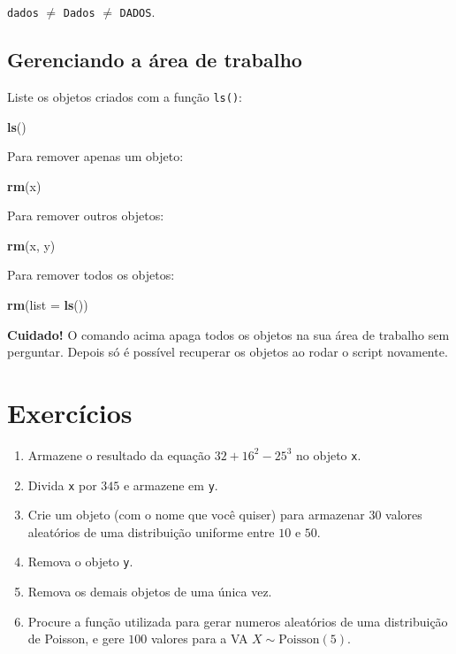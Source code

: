 \documentclass[10pt,a4paper]{book}
\newenvironment{Shaded}{\begin{snugshade}}{\end{snugshade}}
\newcommand{\KeywordTok}[1]{\textcolor[rgb]{0.13,0.29,0.53}{\textbf{#1}}}
\newcommand{\DataTypeTok}[1]{\textcolor[rgb]{0.13,0.29,0.53}{#1}}
\newcommand{\NormalTok}[1]{#1}
\providecommand{\tightlist}{%
  \setlength{\itemsep}{0pt}\setlength{\parskip}{0pt}}
\begin{document}
\texttt{dados} \(\neq\) \texttt{Dados} \(\neq\) \texttt{DADOS}.

\subsection{Gerenciando a área de
trabalho}\label{gerenciando-a-uxe1rea-de-trabalho}

Liste os objetos criados com a função \texttt{ls()}:

\begin{Shaded}
\begin{Highlighting}[]
\KeywordTok{ls}\NormalTok{()}
\end{Highlighting}
\end{Shaded}

Para remover apenas um objeto:

\begin{Shaded}
\begin{Highlighting}[]
\KeywordTok{rm}\NormalTok{(x)}
\end{Highlighting}
\end{Shaded}

Para remover outros objetos:

\begin{Shaded}
\begin{Highlighting}[]
\KeywordTok{rm}\NormalTok{(x, y)}
\end{Highlighting}
\end{Shaded}

Para remover todos os objetos:

\begin{Shaded}
\begin{Highlighting}[]
\KeywordTok{rm}\NormalTok{(}\DataTypeTok{list =} \KeywordTok{ls}\NormalTok{())}
\end{Highlighting}
\end{Shaded}

\textbf{Cuidado!} O comando acima apaga todos os objetos na sua área de
trabalho sem perguntar. Depois só é possível recuperar os objetos ao
rodar o script novamente.

\section*{Exercícios}\label{exercuxedcios-2}


\begin{enumerate}
\def\labelenumi{\arabic{enumi}.}
\tightlist
\item
  Armazene o resultado da equação \(32 + 16^2 - 25^3\) no objeto
  \texttt{x}.
\item
  Divida \texttt{x} por \(345\) e armazene em \texttt{y}.
\item
  Crie um objeto (com o nome que você quiser) para armazenar \(30\)
  valores aleatórios de uma distribuição uniforme entre \(10\) e \(50\).
\item
  Remova o objeto \texttt{y}.
\item
  Remova os demais objetos de uma única vez.
\item
  Procure a função utilizada para gerar numeros aleatórios de uma
  distribuição de Poisson, e gere \(100\) valores para a VA
  \(X \sim  \text{Poisson}(5)\).
\end{enumerate}
\end{document}
